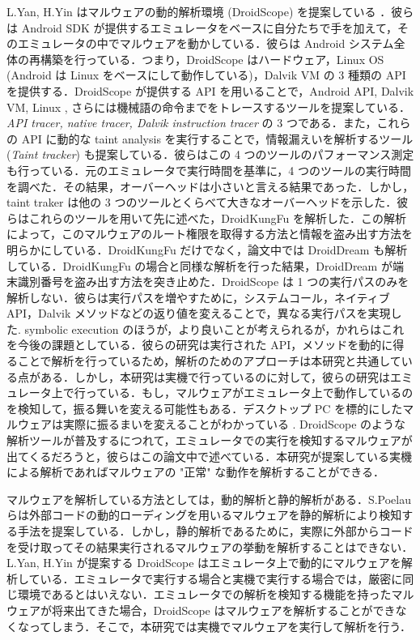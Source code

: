L.Yan, H.Yin はマルウェアの動的解析環境 (DroidScope) を提案している \cite{droidscope} ．彼らは Android SDK が提供するエミュレータをベースに自分たちで手を加えて，そのエミュレータの中でマルウェアを動かしている．彼らは Android システム全体の再構築を行っている．つまり，DroidScope はハードウェア，Linux OS (Android は Linux をベースにして動作している)，Dalvik VM の 3 種類の API を提供する．DroidScope が提供する API を用いることで，Android API, Dalvik VM, Linux , さらには機械語の命令までをトレースするツールを提案している．{\it API tracer, native tracer, Dalvik instruction tracer} の 3 つである．また，これらの API に動的な taint analysis を実行することで，情報漏えいを解析するツール ({\it Taint tracker}) も提案している．彼らはこの 4 つのツールのパフォーマンス測定も行っている．元のエミュレータで実行時間を基準に，4 つのツールの実行時間を調べた．その結果，オーバーヘッドは小さいと言える結果であった．しかし，taint traker は他の 3 つのツールとくらべて大きなオーバーヘッドを示した．彼らはこれらのツールを用いて先に述べた，DroidKungFu を解析した．この解析によって，このマルウェアのルート権限を取得する方法と情報を盗み出す方法を明らかにしている．DroidKungFu だけでなく，論文中では DroidDream も解析している．DroidKungFu の場合と同様な解析を行った結果，DroidDream が端末識別番号を盗み出す方法を突き止めた．DroidScope は 1 つの実行パスのみを解析しない．彼らは実行パスを増やすために，システムコール，ネイティブ API，Dalvik メソッドなどの返り値を変えることで，異なる実行パスを実現した. symbolic execution のほうが，より良いことが考えられるが，かれらはこれを今後の課題としている．彼らの研究は実行された API，メソッドを動的に得ることで解析を行っているため，解析のためのアプローチは本研究と共通している点がある．しかし，本研究は実機で行っているのに対して，彼らの研究はエミュレータ上で行っている．もし，マルウェアがエミュレータ上で動作しているのを検知して，振る舞いを変える可能性もある．デスクトップ PC を標的にしたマルウェアは実際に振るまいを変えることがわかっている \cite{detection} \cite{emulation} \cite{v2e} . DroidScope のような解析ツールが普及するにつれて，エミュレータでの実行を検知するマルウェアが出てくるだろうと，彼らはこの論文中で述べている．本研究が提案している実機による解析であればマルウェアの "正常" な動作を解析することができる．

マルウェアを解析している方法としては，動的解析と静的解析がある．S.Poelau らは外部コードの動的ローディングを用いるマルウェアを静的解析により検知する手法を提案している．しかし，静的解析であるために，実際に外部からコードを受け取ってその結果実行されるマルウェアの挙動を解析することはできない．L.Yan, H.Yin が提案する DroidScope はエミュレータ上で動的にマルウェアを解析している．エミュレータで実行する場合と実機で実行する場合では，厳密に同じ環境であるとはいえない．エミュレータでの解析を検知する機能を持ったマルウェアが将来出てきた場合，DroidScope はマルウェアを解析することができなくなってしまう．そこで，本研究では実機でマルウェアを実行して解析を行う．


